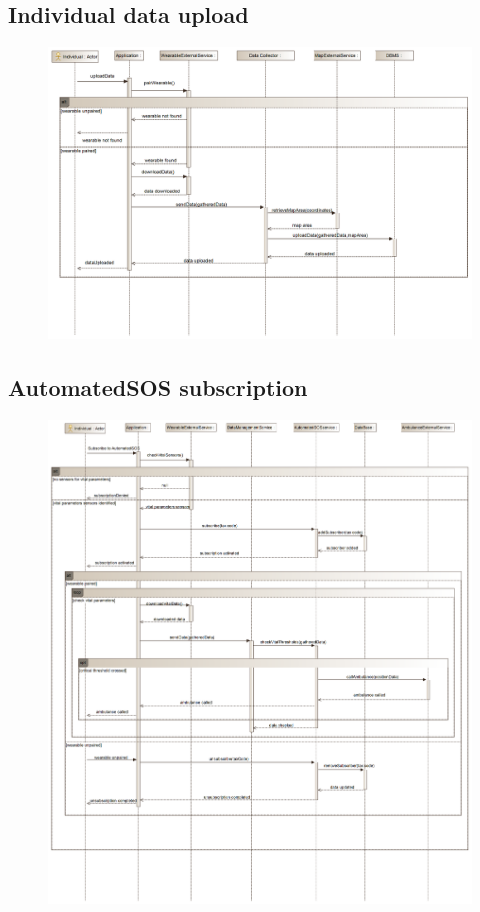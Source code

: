 \subsection{Individual data upload}
\begin{figure}[h]
\centering
\includegraphics[width=\linewidth]{resources/uml/sequence/wearablePairing.png}
\end{figure}

\subsection{AutomatedSOS subscription}
\begin{figure}[h]
\centering
\includegraphics[width=\linewidth]{resources/uml/sequence/AutomatedSOS.png}
\end{figure}


